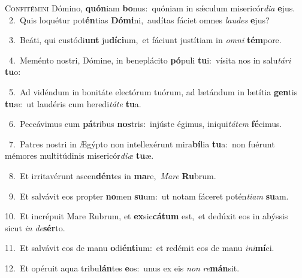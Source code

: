 \lettrine{\initial\textcolor{\initialcolor}{C}}{onfitémini} Dómino, \textbf{quón}\-iam \textbf{bo}\-nus:~\star quóniam in sǽculum misericór\-\textit{di}\-\textit{a} \textbf{e}\-jus.\\
{\numbfont\textcolor{\numbcolor}{~2.}}~Quis loquétur pot\-\textbf{én}\-tias \textbf{Dó}\-\textbf{mi}ni,~\star audítas fáciet omnes \textit{lau}\-\textit{des} \textbf{e}\-jus?\par
{\numbfont\textcolor{\numbcolor}{~3.}}~Beáti, qui custódi\textbf{unt} ju\-\textbf{dí}\-\textbf{ci}um,~\star et fáciunt justítiam in \textit{om}\-\textit{ni} \textbf{tém}\-pore.\par
{\numbfont\textcolor{\numbcolor}{~4.}}~Meménto nostri, Dómine, in beneplácito \textbf{pó}\-puli \textbf{tu}\-i:~\star vísita nos in salu\-\textit{tá}\-\textit{ri} \textbf{tu}\-o:\par
{\numbfont\textcolor{\numbcolor}{~5.}}~Ad vidéndum in bonitáte electórum tuórum, ad lætándum in lætítia \textbf{gen}\-tis \textbf{tu}\-æ:~\star ut laudéris cum heredi\-\textit{tá}\-\textit{te} \textbf{tu}\-a.\par
{\numbfont\textcolor{\numbcolor}{~6.}}~Peccávimus cum \textbf{pá}\-tribus \textbf{nos}\-tris:~\star injúste égimus, iniqui\-\textit{tá}\-\textit{tem} \textbf{fé}\-cimus.\par
{\numbfont\textcolor{\numbcolor}{~7.}}~Patres nostri in Ægýpto non intellexérunt mira\-\textbf{bí}\-lia \textbf{tu}\-a:~\star non fuérunt mémores multitúdinis misericór\-\textit{di}\-\textit{æ} \textbf{tu}\-æ.\par
{\numbfont\textcolor{\numbcolor}{~8.}}~Et irritavérunt ascen\-\textbf{dén}\-tes in \textbf{ma}\-re,~\star \textit{Ma}\-\textit{re} \textbf{Ru}\-brum.\par
{\numbfont\textcolor{\numbcolor}{~9.}}~Et salvávit eos propter \textbf{no}\-men \textbf{su}\-um:~\star ut notam fáceret potén\-\textit{ti}\-\textit{am} \textbf{su}\-am.\par
{\numbfont\textcolor{\numbcolor}{10.}}~Et incrépuit Mare Rubrum, et \textbf{ex}\-sic\-\textbf{cá}\-\textbf{tum} est,~\star et dedúxit eos in abýssis sicut \textit{in} \textit{de}\-\textbf{sér}to.\par
{\numbfont\textcolor{\numbcolor}{11.}}~Et salvávit eos de manu \textbf{o}\-di\-\textbf{én}\-\textbf{ti}um:~\star et redémit eos de manu \textit{in}\-\textit{i}\textbf{mí}ci.\par
{\numbfont\textcolor{\numbcolor}{12.}}~Et opéruit aqua tribu\-\textbf{lán}\-tes \textbf{e}\-os:~\star unus ex eis \textit{non} \textit{re}\-\textbf{mán}sit.\par
